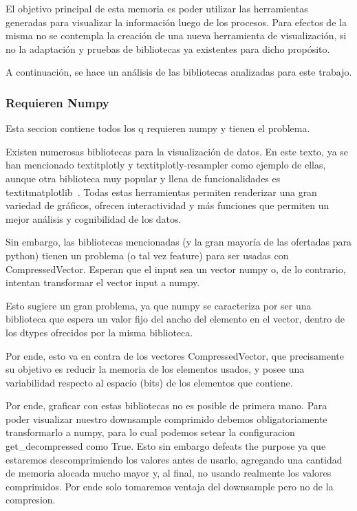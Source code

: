 El objetivo principal de esta memoria es poder utilizar las herramientas generadas para visualizar la información luego de los procesos. Para efectos de la misma no se contempla la creación de una nueva herramienta de visualización, si no la adaptación y pruebas de bibliotecas ya existentes para dicho propósito.

A continuación, se hace un análisis de las bibliotecas analizadas para este trabajo.

\subsubsection{Requieren Numpy}

Esta seccion contiene todos los q requieren numpy y tienen el problema.

Existen numerosas bibliotecas para la visualización de datos. En este texto, ya se han mencionado textit{plotly} y textit{plotly-resampler} como ejemplo de ellas, aunque otra biblioteca muy popular y llena de funcionalidades es textit{matplotlib}~\cite{matplotlib}. Todas estas herramientas permiten renderizar una gran variedad de gráficos, ofrecen interactividad y más funciones que permiten un mejor análisis y cognibilidad de los datos.

Sin embargo, las bibliotecas mencionadas (y la gran mayoría de las ofertadas para python) tienen un problema (o tal vez feature) para ser usadas con CompressedVector. Esperan que el input sea un vector numpy o, de lo contrario, intentan transformar el vector input a numpy.

Esto sugiere un gran problema, ya que numpy se caracteriza por ser una biblioteca que espera un valor fijo del ancho del elemento en el vector, dentro de los dtypes ofrecidos por la misma biblioteca.

Por ende, esto va en contra de los vectores CompressedVector, que precisamente su objetivo es reducir la memoria de los elementos usados, y posee una variabilidad respecto al espacio (bits) de los elementos que contiene. 

Por ende, graficar con estas bibliotecas no es posible de primera mano. Para poder visualizar nuestro downsample comprimido debemos obligatoriamente transformarlo a numpy, para lo cual podemos setear la configuracion get\_decompressed como True. Esto sin embargo defeats the purpose ya que estaremos descomprimiendo los valores antes de usarlo, agregando una cantidad de memoria alocada mucho mayor y, al final, no usando realmente los valores comprimidos. Por ende solo tomaremos ventaja del downsample pero no de la compresion.

